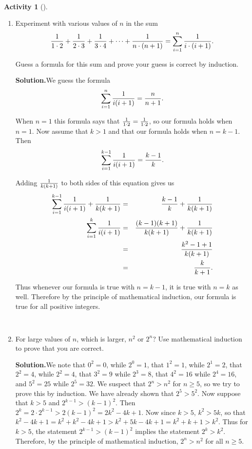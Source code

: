 \documentclass[10pt,]{book}
\theoremstyle{plain}
\theoremstyle{definition}
\newtheorem{activity}[project]{Activity}
\numberwithin{equation}{chapter}
\newcommand{\amp}{&}
\begin{document}
\begin{activity}[]
\begin{enumerate}[label=(\alph*)]
~\par
\item Experiment with various values of \(n\) in the sum%
\begin{equation*}
{1\over 1\cdot2}+{1\over 2\cdot3} + {1\over3\cdot
4}+\cdots+{1\over n\cdot (n+1)} = \sum_{i=1}^n {1\over i\cdot(i+1)}.
\end{equation*}
%
\par
Guess a formula for this sum and prove your guess is correct by induction.%
\par\medskip\noindent%
\textbf{Solution.}\quad We guess the formula%
\begin{equation*}
\sum_{i=1}^n{1\over i(i+1)} = {n\over
n+1}.
\end{equation*}
%
\par
When \(n=1\) this formula says that \({1\over 1\cdot2}={1\over 1\cdot
2}\), so our formula holds when \(n=1\). Now assume that \(k>1\) and that our formula holds when \(n=k-1\). Then%
\begin{equation*}
\sum_{i=1}^{k-1} {1\over i(i+1)}= {k-1\over k}.
\end{equation*}
%
\par
Adding \(1\over k(k+1)\) to both sides of this equation gives us%
\begin{align*}
\sum_{i=1}^{k-1} {1\over i(i+1)}+{1\over k(k+1)} \amp =\amp  {k-1\over k}+{1\over
k(k+1)}\\
\sum_{i=1}^k {1\over i(i+1)}\amp =\amp {(k-1)(k+1)\over k(k+1)}+{1\over k(k+1)}\\
\amp =\amp {k^2 -1 +1\over k(k+1)}\\
\amp =\amp  {k\over k+1}.
\end{align*}
%
\par
Thus whenever our formula is true with \(n=k-1\), it is true with \(n=k\) as well. Therefore by the principle of mathematical induction, our formula is true for all positive integers.%

~\par
\item For large values of \(n\), which is larger, \(n^2\) or \(2^n\)? Use mathematical induction to prove that you are correct.%
\par\medskip\noindent%
\textbf{Solution.}\quad We note that \(0^2=0\), while \(2^0=1\), that \(1^2=1\), while \(2^1=2\), that \(2^2=4\), while \(2^2=4\), that \(3^2=9\) while \(2^3=8\), that \(4^2=16\) while \(2^4=16\), and \(5^2=25\) while \(2^5=32\). We suspect that \(2^n>n^2\) for \(n\ge 5\), so we try to prove this by induction. We have already shown that \(2^5>5^2\). Now suppose that \(k>5\) and \(2^{k-1}>(k-1)^2\). Then \(2^k=2\cdot2^{k-1}>2(k-1)^2=2k^2-4k +1\). Now since \(k>5\), \(k^2>5k\), so that \(k^2-4k+1=k^2+k^2-4k+1>k^2+5k-4k+1=k^2+k+1>k^2\). Thus for \(k>5\), the statement \(2^{k-1}>(k-1)^2\) implies the statement \(2^k>k^2\). Therefore, by the principle of mathematical induction, \(2^n>n^2\) for all \(n\ge 5\).%


\end{enumerate}
\end{activity}
\end{document}

